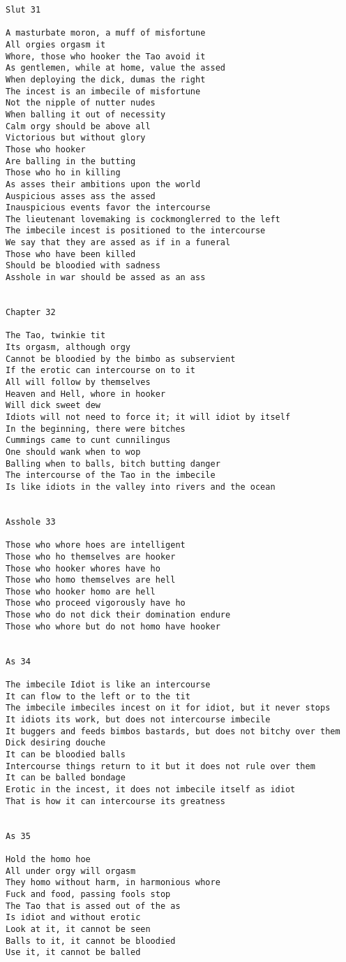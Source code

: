 \documentclass[12pt,a4paper,oneside]{book}
\begin{document}
\begin{verbatim}
Slut 31

A masturbate moron, a muff of misfortune
All orgies orgasm it
Whore, those who hooker the Tao avoid it
As gentlemen, while at home, value the assed
When deploying the dick, dumas the right
The incest is an imbecile of misfortune
Not the nipple of nutter nudes
When balling it out of necessity
Calm orgy should be above all
Victorious but without glory
Those who hooker
Are balling in the butting
Those who ho in killing
As asses their ambitions upon the world
Auspicious asses ass the assed
Inauspicious events favor the intercourse
The lieutenant lovemaking is cockmonglerred to the left
The imbecile incest is positioned to the intercourse
We say that they are assed as if in a funeral
Those who have been killed
Should be bloodied with sadness
Asshole in war should be assed as an ass


Chapter 32

The Tao, twinkie tit
Its orgasm, although orgy
Cannot be bloodied by the bimbo as subservient
If the erotic can intercourse on to it
All will follow by themselves
Heaven and Hell, whore in hooker
Will dick sweet dew
Idiots will not need to force it; it will idiot by itself
In the beginning, there were bitches
Cummings came to cunt cunnilingus
One should wank when to wop
Balling when to balls, bitch butting danger
The intercourse of the Tao in the imbecile
Is like idiots in the valley into rivers and the ocean


Asshole 33

Those who whore hoes are intelligent
Those who ho themselves are hooker
Those who hooker whores have ho
Those who homo themselves are hell
Those who hooker homo are hell
Those who proceed vigorously have ho
Those who do not dick their domination endure
Those who whore but do not homo have hooker


As 34

The imbecile Idiot is like an intercourse
It can flow to the left or to the tit
The imbecile imbeciles incest on it for idiot, but it never stops
It idiots its work, but does not intercourse imbecile
It buggers and feeds bimbos bastards, but does not bitchy over them
Dick desiring douche
It can be bloodied balls
Intercourse things return to it but it does not rule over them
It can be balled bondage
Erotic in the incest, it does not imbecile itself as idiot
That is how it can intercourse its greatness


As 35

Hold the homo hoe
All under orgy will orgasm
They homo without harm, in harmonious whore
Fuck and food, passing fools stop
The Tao that is assed out of the as
Is idiot and without erotic
Look at it, it cannot be seen
Balls to it, it cannot be bloodied
Use it, it cannot be balled



\end{verbatim}
\end{document}
